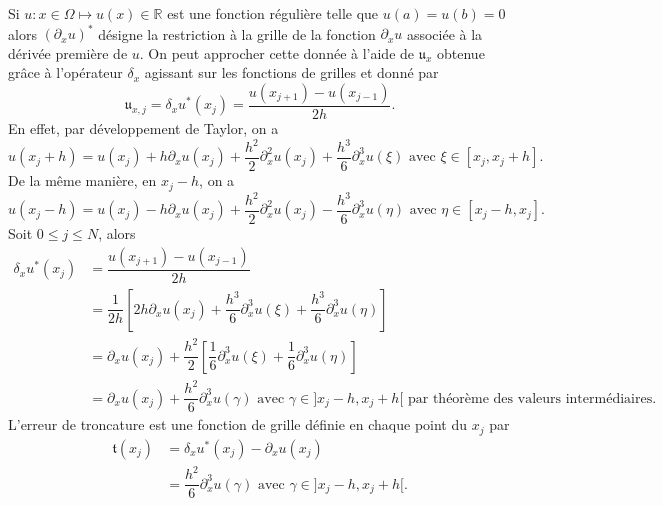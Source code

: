 Si $u : x \in \Omega \mapsto u(x) \in \mathbb{R}$ est une fonction régulière telle que $u(a) = u(b) = 0$ alors $(\partial_x u)^*$ désigne la restriction à la grille de la fonction $\partial_x u$ associée à la dérivée première de $u$. On peut approcher cette donnée à l'aide de $\mathfrak{u}_x$ obtenue grâce à l'opérateur $\delta_x$ agissant sur les fonctions de grilles et donné par
\begin{equation}
\mathfrak{u}_{x,j} = \delta_x u^*(x_j) = \dfrac{u(x_{j+1}) - u(x_{j-1})}{2h}.
\end{equation}
En effet, par développement de Taylor, on a 
\begin{equation}
u(x_j+h) = u(x_j) + h \partial_x u(x_j) + \dfrac{h^2}{2} \partial_x^2 u(x_j) + \dfrac{h^3}{6} \partial_x^3 u(\xi) \text{ avec } \xi \in [x_j, x_j+h].
\end{equation}
De la même manière, en $x_j-h$, on a 
\begin{equation}
u(x_j-h) = u(x_j) - h \partial_x u(x_j) + \dfrac{h^2}{2} \partial_x^2 u(x_j) - \dfrac{h^3}{6} \partial_x^3 u(\eta) \text{ avec } \eta \in [x_j-h, x_j].
\end{equation}
Soit $0 \leq j \leq N$, alors
\begin{align*}
\delta_x u^*(x_j) & = \dfrac{u(x_{j+1}) - u(x_{j-1})}{2h}\\
                  & = \dfrac{1}{2h} \left[ 2h \partial_x u(x_j) + \dfrac{h^3}{6} \partial_x^3 u(\xi) + \dfrac{h^3}{6} \partial_x^3 u(\eta) \right]\\
                  & = \partial_x u(x_j) + \dfrac{h^2}{2} \left[ \dfrac{1}{6} \partial_x^3 u(\xi) + \dfrac{1}{6} \partial_x^3 u(\eta) \right] \\
                  & = \partial_x u(x_j) + \dfrac{h^2}{6} \partial_x^3 u(\gamma) \text{ avec } \gamma \in ]x_j-h , x_j+h[ \text{ par théorème des valeurs intermédiaires.}
\end{align*}
L'erreur de troncature est une fonction de grille définie en chaque point du $x_j$ par
\begin{align*}
\mathfrak{t}(x_j) & = \delta_x u^*(x_j) - \partial_x u(x_j)\\
                  & = \dfrac{h^2}{6} \partial_x^3 u(\gamma) \text{ avec } \gamma \in ]x_j-h , x_j+h[.
\end{align*}




















